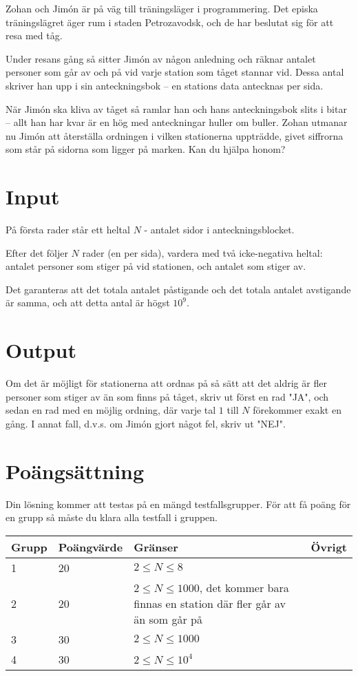 
Zohan och Jimón är på väg till träningsläger i programmering. Det episka träningslägret äger rum i staden Petrozavodsk, och de har beslutat sig för att resa med tåg.

Under resans gång så sitter Jimón av någon anledning och räknar antalet personer som går av och på vid varje station som tåget stannar vid. Dessa antal skriver han
upp i sin anteckningsbok -- en stations data antecknas per sida.

När Jimón ska kliva av tåget så ramlar han och hans anteckningsbok slits i bitar -- allt han har kvar är en hög med anteckningar huller om buller. Zohan utmanar nu
Jimón att återställa ordningen i vilken stationerna uppträdde, givet siffrorna som står på sidorna som ligger på marken. Kan du hjälpa honom?

\section*{Input}
På första rader står ett heltal $N$ - antalet sidor i anteckningsblocket.

Efter det följer $N$ rader (en per sida), vardera med två icke-negativa heltal: antalet personer som stiger på vid stationen, och antalet som stiger av.

Det garanteras att det totala antalet påstigande och det totala antalet avstigande är samma, och att detta antal är högst $10^9$. 

\section*{Output}
Om det är möjligt för stationerna att ordnas på så sätt att det aldrig är fler personer som stiger av än som finns på tåget, skriv ut först en rad "JA", och sedan en rad med en möjlig ordning, där varje tal $1$ till $N$ förekommer exakt en gång.
I annat fall, d.v.s. om Jimón gjort något fel, skriv ut "NEJ".

\section*{Poängsättning}
Din lösning kommer att testas på en mängd testfallsgrupper. För att få poäng för en grupp så måste du klara alla testfall i gruppen.

\begin{tabular}{| l | l | l | l |}
\hline
Grupp & Poängvärde & Gränser & Övrigt\\ \hline
1     & 20         & $ 2 \le N \le 8 $ & \\ \hline
2     & 20         & $ 2 \le N \le 1000 $, det kommer bara finnas en station där fler går av än som går på & \\ \hline
3     & 30         & $ 2 \le N \le 1000 $ & \\ \hline
4     & 30         & $ 2 \le N \le 10^4 $ & \\ \hline
\end{tabular}
